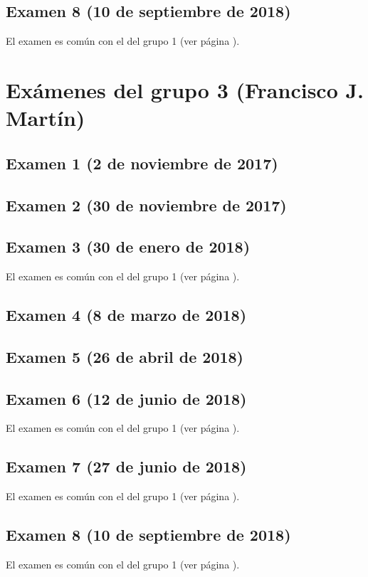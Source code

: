 \documentclass[a4paper,12pt,twoside]{book}
\begin{document}
\subsection{Examen 8 (10 de septiembre de 2018)}
El examen es común con el del grupo 1 (ver página \pageref{examen_17_18_4_8}).

\section{Exámenes del grupo 3 (Francisco J. Martín)}
\subsection{Examen 1 (2 de noviembre de 2017)}
\subsection{Examen 2 (30 de noviembre de 2017)}
\subsection{Examen 3 (30 de enero de 2018)}
El examen es común con el del grupo 1 (ver página \pageref{examen_17_18_1_3}).
\subsection{Examen 4 (8 de marzo de 2018)}
\subsection{Examen 5 (26 de abril de 2018)}
\subsection{Examen 6 (12 de junio de 2018)}
El examen es común con el del grupo 1 (ver página \pageref{examen_17_18_1_6}).
\subsection{Examen 7 (27 de junio de 2018)}
El examen es común con el del grupo 1 (ver página \pageref{examen_17_18_4_7}).
\subsection{Examen 8 (10 de septiembre de 2018)}
El examen es común con el del grupo 1 (ver página \pageref{examen_17_18_4_8}).
\end{document}
